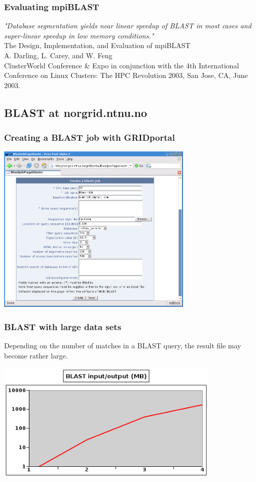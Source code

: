 \documentclass{beamer}
\begin{document}
\begin{frame}
  \frametitle{Evaluating mpiBLAST}

  {\it "Database segmentation yields near linear speedup of BLAST in most cases and super-linear speedup in low memory conditions."}\\  
	{\footnotesize The Design, Implementation, and Evaluation of mpiBLAST\\
	A. Darling, L. Carey, and W. Feng}\\
	{\scriptsize ClusterWorld Conference \& Expo in conjunction with the 4th International Conference on Linux Clusters: The HPC Revolution 2003, San Jose, CA, June 2003.}
\end{frame}





\subsection{BLAST at norgrid.ntnu.no}

\begin{frame}
  \frametitle{Creating a BLAST job with GRIDportal}

	\begin{center}
		\includegraphics[width=0.7\textwidth]{portal_createblast.png}
	\end{center}	
\end{frame}


\begin{frame}
  \frametitle{BLAST with large data sets}

	Depending on the number of matches in a BLAST query, the result file may become rather large.
	
	\begin{center}
		\includegraphics[width=0.8\textwidth]{blast_filesize.png}
	\end{center}		
\end{frame}
\end{document}
